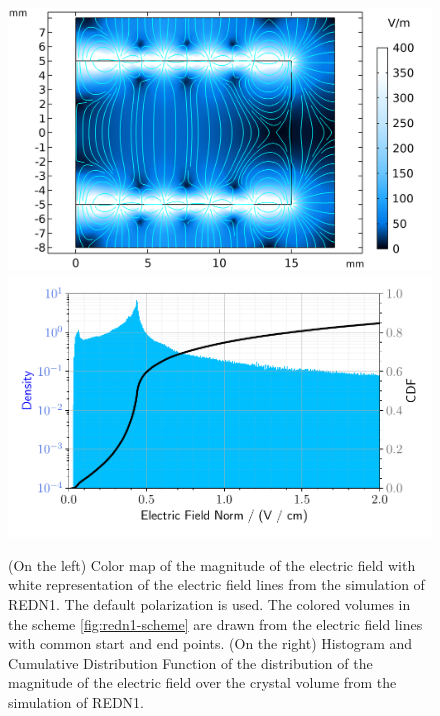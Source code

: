 \begin{figure}
\centering
\includegraphics[align=c, scale=0.5]{Figures/ElectrodesExperimental/efield_redn1.png}
\includegraphics[align=c, scale=0.5]{Figures/ElectrodesExperimental/enorm_hist_redn1.pdf}
\caption{(On the left) Color map of the magnitude of the electric field with white representation of the electric field lines from the simulation of REDN1. The default polarization is used. The colored volumes in the scheme \ref{fig:redn1-scheme} are drawn from the electric field lines with common start and end points.
(On the right) Histogram and Cumulative Distribution Function of the distribution of the magnitude of the electric field over the crystal volume from the simulation of REDN1.}
\label{fig:redn1-efield}
\end{figure}

